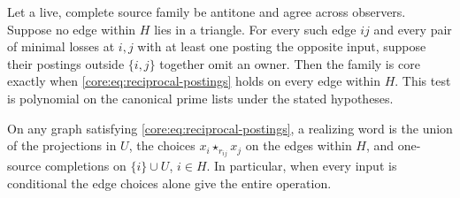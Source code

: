 \begin{theorem}
\label{core:thm:triangle-free-source-guards}
Let a live, complete source family be antitone and agree across observers.
Suppose no edge within $H$ lies in a triangle. For every such edge $ij$
and every pair of minimal losses at $i,j$ with at least one posting the
opposite input, suppose their postings outside $\{i,j\}$ together omit
an owner. Then the family is core exactly when
\eqref{core:eq:reciprocal-postings} holds on every edge within $H$.
This test is polynomial on the canonical prime lists under the stated
hypotheses.

On any graph satisfying \eqref{core:eq:reciprocal-postings}, a realizing
word is the union of the projections in $U$, the choices
$x_i\star_{r_{ij}}x_j$ on the edges within $H$, and one-source
completions on $\{i\}\cup U$, $i\in H$.
In particular, when every input is conditional the edge choices alone
give the entire operation.
\end{theorem}
